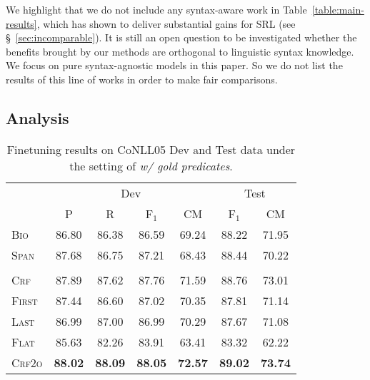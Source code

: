 \documentclass[11pt]{article}
\newcommand*{\rulefiller}{\arrayrulecolor[gray]{0.95}\specialrule{\heavyrulewidth}{0pt}{-\heavyrulewidth}\arrayrulecolor{black}}
\begin{document}
We highlight that we do not include any syntax-aware work \cite{xia-etal-2019-syntax,zhou-etal-2020-parsing} in Table~\ref{table:main-results}, which has shown to deliver substantial gains for SRL (see \S~\ref{sec:incomparable}).
It is still an open question to be investigated whether the benefits brought by our methods are orthogonal to linguistic syntax knowledge.
We focus on pure syntax-agnostic models in this paper.
So we do not list the results of this line of works in order to make fair comparisons.


\subsection{Analysis}\label{subsec:analysis}

\begin{table}[tb!]
    \renewcommand{\arraystretch}{1.1}
    \setlength{\tabcolsep}{4.5pt}
    \centering
    \begin{small}
        \begin{tabular}{l cccccc}
            \toprule
            \rowcolor[gray]{0.95} & \multicolumn{4}{c}{Dev} & \multicolumn{2}{c}{Test}                                                                     \\
            \rulefiller\cmidrule(lr){2-5} \cmidrule(lr){6-7}
            \rowcolor[gray]{0.95} & P                       & R                        & F$_1$          & CM             & F$_1$          & CM             \\
            \midrule
            \textsc{Bio}          & 86.80                   & 86.38                    & 86.59          & 69.24          & 88.22          & 71.95          \\
            \textsc{Span}         & 87.68                   & 86.75                    & 87.21          & 68.43          & 88.44          & 70.22          \\\\[-10pt]
            \textsc{Crf}          & 87.89                   & 87.62                    & 87.76          & 71.59          & 88.76          & 73.01          \\
            \quad\textsc{First}   & 87.44                   & 86.60                    & 87.02          & 70.35          & 87.81          & 71.14          \\
            \quad\textsc{Last}    & 86.99                   & 87.00                    & 86.99          & 70.29          & 87.67          & 71.08          \\
            \quad\textsc{Flat}    & 85.63                   & 82.26                    & 83.91          & 63.41          & 83.32          & 62.22          \\
            \textsc{Crf2o}        & \textbf{88.02}          & \textbf{88.09}           & \textbf{88.05} & \textbf{72.57} & \textbf{89.02} & \textbf{73.74} \\
            \bottomrule
        \end{tabular}
        \caption{Finetuning results on CoNLL05 Dev and Test data under the setting of \emph{w/ gold predicates}.}
        \label{table:conll05-dev}
    \end{small}
\end{table}
\end{document}
